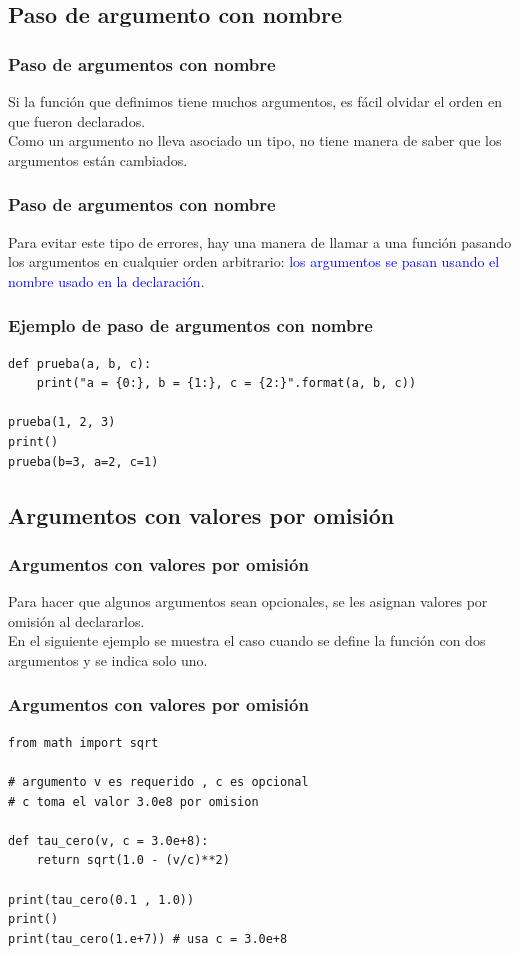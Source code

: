\documentclass[12pt]{beamer}
\begin{document}
\subsection{Paso de argumento con nombre}

\begin{frame}
\frametitle{Paso de argumentos con nombre}
Si la función que definimos tiene muchos argumentos, es fácil olvidar el orden en que fueron declarados.
\\
\bigskip
\pause
Como un argumento no lleva asociado un tipo, \python{} no tiene manera de saber que los argumentos están cambiados.
\end{frame}
\begin{frame}
\frametitle{Paso de argumentos con nombre}
Para evitar este tipo de errores, hay una manera de llamar a una función pasando los argumentos en cualquier orden arbitrario: \textcolor{blue}{los argumentos se pasan usando el nombre usado en la declaración}.
\end{frame}
\begin{frame}[fragile]
\frametitle{Ejemplo de paso de argumentos con nombre}
\begin{lstlisting}[caption=Paso de argumentos con nombre,basicstyle=\linespread{1.2}\ttfamily\small, columns=fullflexible,escapeinside=||]
def prueba(a, b, c):
    print("a = {0:}, b = {1:}, c = {2:}".format(a, b, c))

prueba(1, 2, 3)
print()
prueba(b=3, a=2, c=1)
\end{lstlisting}
\end{frame}

\subsection{Argumentos con valores por omisión}

\begin{frame}[fragile]
\frametitle{Argumentos con valores por omisión}
Para hacer que algunos argumentos sean opcionales, se les asignan valores por omisión al declararlos.
\\
\bigskip
\pause
En el siguiente ejemplo se muestra el caso cuando se define la función con dos argumentos y se indica solo uno.
\end{frame}
\begin{frame}[fragile]
\frametitle{Argumentos con valores por omisión}    
\begin{lstlisting}[caption=Ejemplo cuando se omiten argumentos declarados, basicstyle=\linespread{1.2}\ttfamily\small, columns=fullflexible,escapeinside=||]
from math import sqrt

# argumento v es requerido , c es opcional
# c toma el valor 3.0e8 por omision

def tau_cero(v, c = 3.0e+8):
    return sqrt(1.0 - (v/c)**2)

print(tau_cero(0.1 , 1.0))
print()
print(tau_cero(1.e+7)) # usa c = 3.0e+8
\end{lstlisting}
\end{frame}
\end{document}
